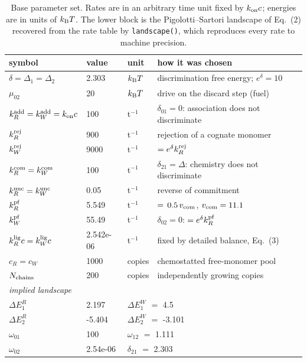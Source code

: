 \begin{table}[t]\centering\small
\caption{Base parameter set.  Rates are in an arbitrary time unit fixed by
$k_{\rm on}c$; energies are in units of $k_\mathrm{B} T$.  The lower block is the
Pigolotti--Sartori landscape of Eq.~(2) recovered from the rate table by
\texttt{landscape()}, which reproduces every rate to machine precision.}
\label{tab:params}
\begin{tabular}{llll}\toprule
symbol & value & unit & how it was chosen \\ \midrule
$\delta=\Delta_1=\Delta_2$ & 2.303 & $k_\mathrm{B} T$ & discrimination free energy; $e^{\delta}=10$ \\
$\mu_{02}$ & 20 & $k_\mathrm{B} T$ & drive on the discard step (fuel) \\
$k^{\rm add}_{R}=k^{\rm add}_{W}=k_{\rm on}c$ & 100 & t$^{-1}$ & $\delta_{01}=0$: association does not discriminate \\
$k^{\rm rej}_{R}$ & 900 & t$^{-1}$ & rejection of a cognate monomer \\
$k^{\rm rej}_{W}$ & 9000 & t$^{-1}$ & $=e^{\delta}k^{\rm rej}_{R}$ \\
$k^{\rm com}_{R}=k^{\rm com}_{W}$ & 100 & t$^{-1}$ & $\delta_{21}=\Delta$: chemistry does not discriminate \\
$k^{\rm unc}_{R}=k^{\rm unc}_{W}$ & 0.05 & t$^{-1}$ & reverse of commitment \\
$k^{\rm pf}_{R}$ & 5.549 & t$^{-1}$ & $=\,0.5\,v_{\rm com}$, $v_{\rm com}=11.1$ \\
$k^{\rm pf}_{W}$ & 55.49 & t$^{-1}$ & $\delta_{02}=0$: $=e^{\delta}k^{\rm pf}_{R}$ \\
$k^{\rm lig}_{R}c=k^{\rm lig}_{W}c$ & 2.542e-06 & t$^{-1}$ & fixed by detailed balance, Eq.~(3) \\
$c_R=c_W$ & 1000 & copies & chemostatted free-monomer pool \\
$N_{\rm chains}$ & 200 & copies & independently growing copies \\
\midrule \multicolumn{4}{l}{\emph{implied landscape}} \\
$\Delta E_1^{R}$ & 2.197 & \multicolumn{2}{l}{ $\Delta E_1^{W}$ $=$ 4.5 } \\
$\Delta E_2^{R}$ & -5.404 & \multicolumn{2}{l}{ $\Delta E_2^{W}$ $=$ -3.101 } \\
$\omega_{01}$ & 100 & \multicolumn{2}{l}{ $\omega_{12}$ $=$ 1.111 } \\
$\omega_{02}$ & 2.54e-06 & \multicolumn{2}{l}{ $\delta_{21}$ $=$ 2.303 } \\
\bottomrule\end{tabular}\end{table}
